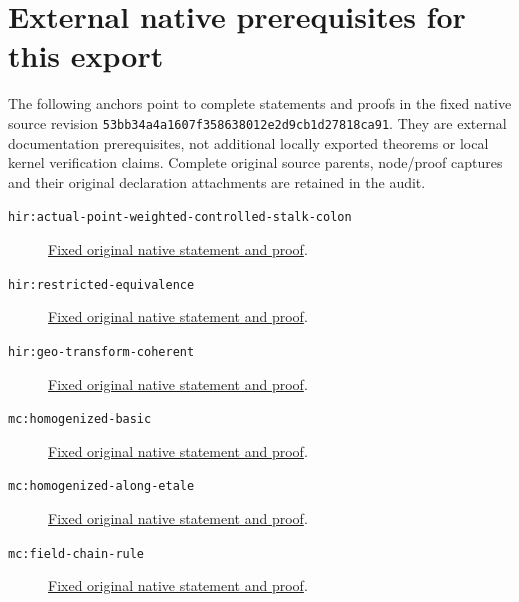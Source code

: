 \section{External native prerequisites for this export}
The following anchors point to complete statements and proofs in the fixed
native source revision \texttt{53bb34a4a1607f358638012e2d9cb1d27818ca91}. They are external documentation
prerequisites, not additional locally exported theorems or local kernel
verification claims. Complete original source parents, node/proof captures
and their original declaration attachments are retained in the audit.
\begin{description}
\item[\texttt{hir:actual-point-weighted-controlled-stalk-colon}]\label{hir:actual-point-weighted-controlled-stalk-colon}
\href{https://github.com/MingchenXia/archon-nakamaye/blob/53bb34a4a1607f358638012e2d9cb1d27818ca91/TranscendentalNakamaye/blueprint/src/hironaka-actual-point-weighted-controlled-stalk-extension.tex#L63}{Fixed original native statement and proof}.
\item[\texttt{hir:restricted-equivalence}]\label{hir:restricted-equivalence}
\href{https://github.com/MingchenXia/archon-nakamaye/blob/53bb34a4a1607f358638012e2d9cb1d27818ca91/TranscendentalNakamaye/blueprint/src/hironaka.tex#L1004}{Fixed original native statement and proof}.
\item[\texttt{hir:geo-transform-coherent}]\label{hir:geo-transform-coherent}
\href{https://github.com/MingchenXia/archon-nakamaye/blob/53bb34a4a1607f358638012e2d9cb1d27818ca91/TranscendentalNakamaye/blueprint/src/hironaka.tex#L533}{Fixed original native statement and proof}.
\item[\texttt{mc:homogenized-basic}]\label{mc:homogenized-basic}
\href{https://github.com/MingchenXia/archon-nakamaye/blob/53bb34a4a1607f358638012e2d9cb1d27818ca91/TranscendentalNakamaye/blueprint/src/maximal-contact.tex#L465}{Fixed original native statement and proof}.
\item[\texttt{mc:homogenized-along-etale}]\label{mc:homogenized-along-etale}
\href{https://github.com/MingchenXia/archon-nakamaye/blob/53bb34a4a1607f358638012e2d9cb1d27818ca91/TranscendentalNakamaye/blueprint/src/maximal-contact.tex#L2013}{Fixed original native statement and proof}.
\item[\texttt{mc:field-chain-rule}]\label{mc:field-chain-rule}
\href{https://github.com/MingchenXia/archon-nakamaye/blob/53bb34a4a1607f358638012e2d9cb1d27818ca91/TranscendentalNakamaye/blueprint/src/maximal-contact.tex#L1685}{Fixed original native statement and proof}.

\end{description}
